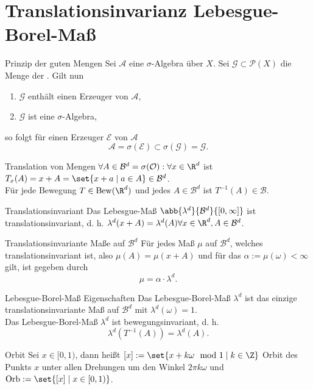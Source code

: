 \section*{Translationsinvarianz Lebesgue-Borel-Maß}

\begin{karte}{Prinzip der guten Mengen}
	Sei \( \mathcal{A} \) eine \(\sigma\)-Algebra über \(X\). Sei \( \mathcal{G} \subset \mathcal{P}(X) \) 
	die Menge der . Gilt nun 
	\begin{enumerate}
		\item \( \mathcal{G} \) enthält einen Erzeuger von \(\mathcal{A}\),
		\item \( \mathcal{G} \) ist eine \(\sigma\)-Algebra,
	\end{enumerate}
	so folgt für einen Erzeuger \( \mathcal{E} \) von \( \mathcal{A} \) 
	\[ \mathcal{A} = \sigma(\mathcal{E}) \subset \sigma(\mathcal{G}) = \mathcal{G}. \]
\end{karte}
\begin{karte}{Translation von Mengen}
	\( \forall A\in \mathcal{B}^d = \sigma(\mathcal{O}): \forall x\in \R^d \) ist 
	\( T_x(A) = x + A = \set{ x + a \;|\; a\in A } \in \mathcal{B}^d \).\\
	Für jede Bewegung \( T\in \mathrm{Bew}(\R^d) \) und jedes \(A \in \mathcal{B}^d \) ist \( T^{-1}(A) \in \mathcal{B} \).
\end{karte}
\begin{karte}{Translationsinvariant}
	Das Lebesgue-Maß \( \abb{\lambda^d}{\mathcal{B}^d}{[0,\infty]} \) ist 
	translationsinvariant, d. h. \( \lambda^d(x+A) = \lambda^d(A) \forall x\in \R^d, A\in \mathcal{B}^d \).
\end{karte}
\begin{karte}{Translationsinvariante Maße auf \(\mathcal{B}^d\)}
	Für jedes Maß \( \mu \) auf \(\mathcal{B}^d\), welches translationsinvariant ist, also 
	\( \mu(A) = \mu(x + A) \) und für das \( \alpha := \mu(\omega) < \infty \) gilt, ist gegeben durch 
	\[ \mu= \alpha \cdot \lambda^d. \]
\end{karte}
\begin{karte}{Lebesgue-Borel-Maß Eigenschaften}
	Das Lebesgue-Borel-Maß \(\lambda^d \) ist das einzige translationsinvariante Maß auf \( \mathcal{B}^d \) 
	mit \( \lambda^d(\omega) = 1 \).\\
	Das Lebesgue-Borel-Maß \( \lambda^d \) ist bewegungsinvariant, d. h. 
	\[ \lambda^d(T^{-1}(A)) = \lambda^d(A). \]
\end{karte}
\begin{karte}{Orbit}
	Sei \( x\in [0,1) \), dann heißt \( [x] := \set{ x + k \omega \mod 1 \;|\; k\in \Z } \) Orbit des 
	Punkts \(x\) unter allen Drehungen um den Winkel \( 2\pi k \omega \) und \( \mathrm{Orb} := \set{ [x] \;|\; x\in [0,1) } \).
\end{karte}
